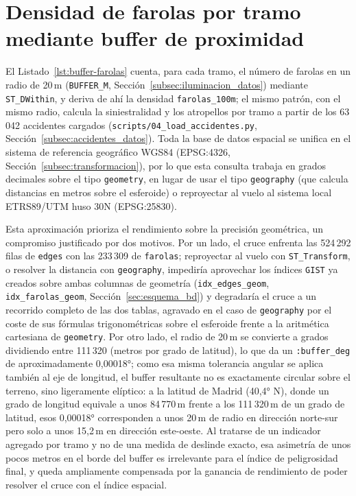 \section{Densidad de farolas por tramo mediante buffer de proximidad}
\label{ap:sec:buffer_farolas}

El Listado~\ref{lst:buffer-farolas} cuenta, para cada tramo, el número de farolas en un radio de 20\,m (\texttt{BUFFER\_M}, Sección~\ref{subsec:iluminacion_datos}) mediante \texttt{ST\_DWithin}, y deriva de ahí la densidad \texttt{farolas\_100m}; el mismo patrón, con el mismo radio, calcula la siniestralidad y los atropellos por tramo a partir de los 63\,042 accidentes cargados (\texttt{scripts/04\_load\_accidentes.py}, Sección~\ref{subsec:accidentes_datos}). Toda la base de datos espacial se unifica en el sistema de referencia geográfico WGS84 (EPSG:4326, Sección~\ref{subsec:transformacion}), por lo que esta consulta trabaja en grados decimales sobre el tipo \texttt{geometry}, en lugar de usar el tipo \texttt{geography} (que calcula distancias en metros sobre el esferoide) o reproyectar al vuelo al sistema local ETRS89/UTM huso 30N (EPSG:25830).

Esta aproximación prioriza el rendimiento sobre la precisión geométrica, un compromiso justificado por dos motivos. Por un lado, el cruce enfrenta las 524\,292 filas de \texttt{edges} con las 233\,309 de \texttt{farolas}; reproyectar al vuelo con \texttt{ST\_Transform}, o resolver la distancia con \texttt{geography}, impediría aprovechar los índices \texttt{GIST} ya creados sobre ambas columnas de geometría (\texttt{idx\_edges\_geom}, \texttt{idx\_farolas\_geom}, Sección~\ref{sec:esquema_bd}) y degradaría el cruce a un recorrido completo de las dos tablas, agravado en el caso de \texttt{geography} por el coste de sus fórmulas trigonométricas sobre el esferoide frente a la aritmética cartesiana de \texttt{geometry}. Por otro lado, el radio de 20\,m se convierte a grados dividiendo entre 111\,320 (metros por grado de latitud), lo que da un \texttt{:buffer\_deg} de aproximadamente 0,00018°; como esa misma tolerancia angular se aplica también al eje de longitud, el buffer resultante no es exactamente circular sobre el terreno, sino ligeramente elíptico: a la latitud de Madrid (40,4° N), donde un grado de longitud equivale a unos 84\,770\,m frente a los 111\,320\,m de un grado de latitud, esos 0,00018° corresponden a unos 20\,m de radio en dirección norte-sur pero solo a unos 15,2\,m en dirección este-oeste. Al tratarse de un indicador agregado por tramo y no de una medida de deslinde exacto, esa asimetría de unos pocos metros en el borde del buffer es irrelevante para el índice de peligrosidad final, y queda ampliamente compensada por la ganancia de rendimiento de poder resolver el cruce con el índice espacial.

